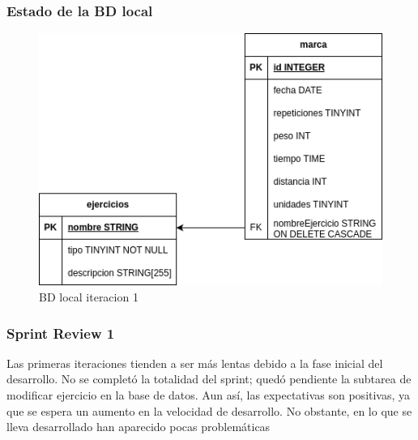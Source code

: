 \subsubsection{Estado de la BD local}

\begin{figure}[H]
   \centering
    \includegraphics[width=\textwidth]{fotos/BDL iteracion 1.png}
    \caption{BD local iteracion 1}
    \label{fig:BD local iteracion 1}
\end{figure}

\subsubsection{Sprint Review 1}
Las primeras iteraciones tienden a ser m\'as lentas debido a la fase inicial del desarrollo. No se complet\'o la totalidad del sprint; qued\'o pendiente la subtarea de modificar ejercicio en la base de datos. Aun as\'i, las expectativas son positivas, ya que se espera un aumento en la velocidad de desarrollo. No obstante, en lo que se lleva  desarrollado han aparecido pocas problemáticas

